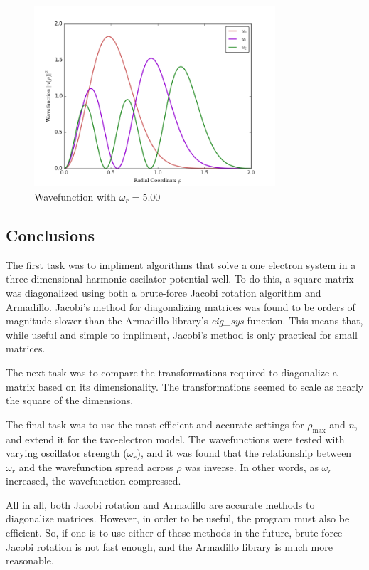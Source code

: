 \documentclass[11pt]{article}
\begin{document}
    \begin{figure}[H] \begin{center}
    \includegraphics[width=0.8\textwidth]{../Code/WavefunctionOmega5.png}
    \end{center} \caption{Wavefunction with $\omega_r = 5.00$} \end{figure}

\subsection{Conclusions}

    The first task was to impliment algorithms that solve a one electron system in a three dimensional harmonic oscilator potential well. To do this, a square matrix was diagonalized using both a brute-force Jacobi rotation algorithm and Armadillo. 
    Jacobi's method for diagonalizing matrices was found to be orders of magnitude slower than the Armadillo library's {\em eig\_sys} function. This means that, while useful and simple to impliment, Jacobi's method is only practical for small matrices. 

    The next task was to compare the transformations required to diagonalize a matrix based on its dimensionality. The transformations seemed to scale as nearly the square of the dimensions.

    The final task was to use the most efficient and accurate settings for $\rho_\text{max}$ and $n$, and extend it for the two-electron model. The wavefunctions were tested with varying oscillator strength ($\omega_r$), and it was found that the relationship between $\omega_r$ and the wavefunction spread across $\rho$ was inverse. In other words, as $\omega_r$ increased, the wavefunction compressed.

    All in all, both Jacobi rotation and Armadillo are accurate methods to diagonalize matrices. However, in order to be useful, the program must also be efficient. So, if one is to use either of these methods in the future, brute-force Jacobi rotation is not fast enough, and the Armadillo library is much more reasonable.
\end{document}
